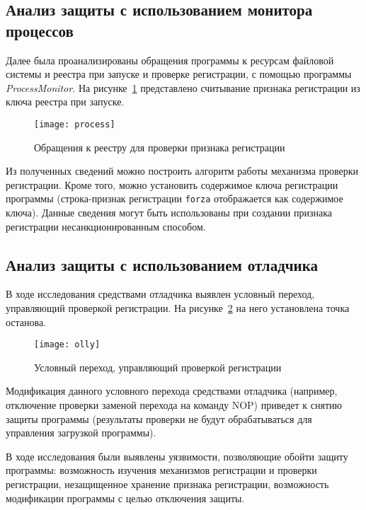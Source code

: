 \subsection{Анализ защиты с использованием монитора процессов}

Далее была проанализированы обращения программы к ресурсам файловой
системы и реестра при запуске и проверке регистрации, с помощью
программы \textit{ProcessMonitor}. На рисунке~\ref{fig:7} представлено
считывание признака регистрации из ключа реестра при запуске.

\begin{figure}[h!]
  \centering
  \texttt{[image: process]}
  \caption{Обращения к реестру для проверки признака регистрации}
  \label{fig:7}
\end{figure}

Из полученных сведений можно построить алгоритм работы механизма
проверки регистрации. Кроме того, можно установить содержимое ключа
регистрации программы (строка-признак регистрации \texttt{forza}
отображается как содержимое ключа). Данные сведения могут быть
использованы при создании признака регистрации несанкционированным
способом.

\subsection{Анализ защиты с использованием отладчика}

В ходе исследования средствами отладчика выявлен условный переход,
управляющий проверкой регистрации. На рисунке~\ref{fig:8} на него
установлена точка останова.

\begin{figure}[h!]
  \centering
  \texttt{[image: olly]}
  \caption{Условный переход, управляющий проверкой регистрации}
  \label{fig:8}
\end{figure}

Модификация данного условного перехода средствами отладчика (например,
отключение проверки заменой перехода на команду NOP) приведет к снятию
защиты программы (результаты проверки не будут обрабатываться для
управления загрузкой программы).

В ходе исследования были выявлены уязвимости, позволяющие обойти
защиту программы: возможность изучения механизмов регистрации и
проверки регистрации, незащищенное хранение признака регистрации,
возможность модификации программы с целью отключения защиты.

